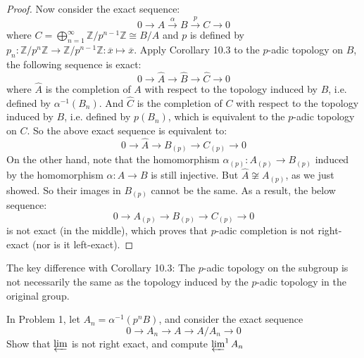 \documentclass{solution}
\begin{document}
\begin{proof}
    Now consider the exact sequence:
    $$0 \rightarrow A \xrightarrow{\alpha} B \xrightarrow{p} C \rightarrow 0$$
    where $C = \bigoplus\limits_{n = 1}^{\infty} \mathbb{Z} / p^{n - 1} \mathbb{Z} \cong B / A$ and $p$ is defined by $p_n: \mathbb{Z} / p^n \mathbb{Z} \rightarrow \mathbb{Z} / p^{n - 1} \mathbb{Z}: \overline{x} \mapsto \overline{x}$. Apply Corollary 10.3 to the $p$-adic topology on $B$, the following sequence is exact:
    $$0 \rightarrow \hat{A} \rightarrow \hat{B} \rightarrow \hat{C} \rightarrow 0$$
    where $\hat{A}$ is the completion of $A$ with respect to the topology induced by $B$, i.e. defined by $\alpha ^{-1} (B_n)$. And $\hat{C}$ is the completion of $C$ with respect to the topology induced by $B$, i.e. defined by $p(B_n)$, which is equivalent to the $p$-adic topology on $C$. So the above exact sequence is equivalent to:
    $$0 \rightarrow \hat{A} \rightarrow B_{(p)} \rightarrow C_{(p)} \rightarrow 0$$
    On the other hand, note that the homomorphism $\alpha_{(p)}: A_{(p)} \rightarrow B_{(p)}$ induced by the homomorphism $\alpha: A \rightarrow B$ is still injective. But $\hat{A} \not \cong A_{(p)}$, as we just showed. So their images in $B_{(p)}$ cannot be the same. As a result, the below sequence:
    $$0 \rightarrow A_{(p)} \rightarrow B_{(p)} \rightarrow C_{(p)} \rightarrow 0$$
    is not exact (in the middle), which proves that $p$-adic completion is not right-exact (nor is it left-exact).
\end{proof}

{\color{red} The key difference with Corollary 10.3: The $p$-adic topology on the subgroup is not necessarily the same as the topology induced by the $p$-adic topology in the original group.}

\begin{problem}
    In Problem 1, let $A_n = \alpha ^{-1}(p^n B)$, and consider the exact sequence
    $$0 \rightarrow A_n \rightarrow A \rightarrow A / A_n \rightarrow 0$$
    Show that $\varprojlim$ is not right exact, and compute $\varprojlim^1 A_n$
\end{problem}
\end{document}
